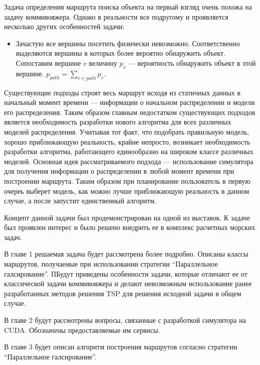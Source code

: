\startprefacepage

Задача определения маршрута поиска объекта на первый взгляд очень похожа на задачу коммивояжера. Однако в реальности все подругому и проявляется несколько других особенностей задачи:
\begin{itemize}
\item{Зачастую все вершины посетить физически невозможно. Соответственно выделяются вершины в которых более вероятно обнаружить объект. Сопоставим вершине $v$ величину $p_v$ --- вероятность обнаружить объект в этой вершине. $p_{path}=\sum\limits_{v\in path}p_v$. }
\end{itemize}

 Существующие подходы строят весь маршрут исходя из статичных данных в начальный момент времени --- информации о начальном распределении и модели его распределения. Таким образом главным недостатком существующих подходов является необходимость разработки нового алгоритма для всех различных моделей распределения. Учитывая тот факт, что подобрать правильную модель, хорошо приближающую реальность, крайне непросто, возникает необходимость разработки алгоритма, работающего единообразно на широком классе различных моделей. Основная идея рассматриваемого подхода --- использование симулятора для получения информации о распределении в любой момент времени при построении маршрута. Таким образом при планирование пользователь в первую очереь выберет модель, как можно лучше приближающую реальность в данном случае, а после запустит единственный алгоритм.

Концепт данной задачи был продемонстрирован на одной из выставок. К задаче был проявлен интерес и было решено внедрить ее в комплекс расчетных морских задач.

В главе 1 решаемая задача будет рассмотрена более подробно. Описаны классы маршрутов, получаемые при использовании стратегии ``Параллельное галсирование''. ПБудут приведены особенности задачи, которые отличают ее от классической задачи коммивояжера и делают невозможным использование ранее разработанных методов решения TSP для решения исходной задачи в общем случае.

В главе 2 будут рассмотрены вопросы, связанные с разработкой симулятора на CUDA. Обозначены предоставляемые им сервисы.

В главе 3 будет описан алгоритм построения маршрутов согласно стратегии ``Параллельное галсирование''.

